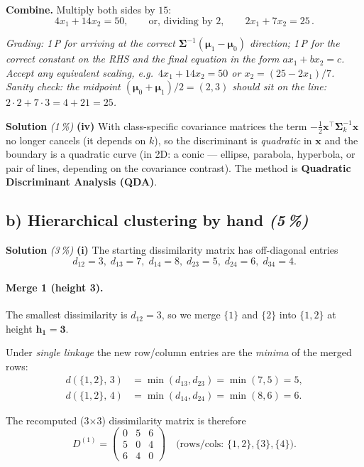 \documentclass[11pt,a4paper]{article}
\newcommand{\subpoints}[1]{\textit{(#1\,\%)}}
\newcommand{\sol}{\noindent\textbf{Solution}}
\begin{document}
\textbf{Combine.} Multiply both sides by $15$:
$$4 x_1 + 14 x_2 = 50, \qquad\text{or, dividing by 2,}\qquad
   \boxed{\,2 x_1 + 7 x_2 = 25\,}.$$

\noindent\emph{Grading: 1\,P for arriving at the correct $\boldsymbol\Sigma^{-1}(\boldsymbol\mu_1-\boldsymbol\mu_0)$
direction; 1\,P for the correct constant on the RHS and the final equation in the form
$ax_1+bx_2=c$. Accept any equivalent scaling, e.g.\ $4x_1+14x_2=50$ or $x_2 = (25-2x_1)/7$.
Sanity check: the midpoint $(\boldsymbol\mu_0+\boldsymbol\mu_1)/2 = (2,3)$ should sit on the line:
$2\cdot 2 + 7\cdot 3 = 4+21 = 25$. \checkmark}

\medskip
\sol{} \subpoints{1} \textbf{(iv)} With class-specific covariance matrices the term
$-\tfrac{1}{2}\mathbf{x}^\top\boldsymbol\Sigma_k^{-1}\mathbf{x}$ no longer cancels (it depends on
$k$), so the discriminant is \emph{quadratic} in $\mathbf{x}$ and the boundary is a quadratic
curve (in 2D: a conic --- ellipse, parabola, hyperbola, or pair of lines, depending on the
covariance contrast). The method is \textbf{Quadratic Discriminant Analysis (QDA)}.

\subsection*{b) Hierarchical clustering by hand \subpoints{5}}

\sol{} \subpoints{3} \textbf{(i)} The starting dissimilarity matrix has off-diagonal entries
$$d_{12}=3,\;d_{13}=7,\;d_{14}=8,\;d_{23}=5,\;d_{24}=6,\;d_{34}=4.$$

\paragraph{Merge 1 (height 3).} The smallest dissimilarity is $d_{12}=3$, so we merge
$\{1\}$ and $\{2\}$ into $\{1,2\}$ at height $\mathbf{h_1=3}$.

Under \emph{single linkage} the new row/column entries are the \emph{minima} of the merged rows:
\begin{align*}
d(\{1,2\},\,3) &= \min(d_{13},d_{23}) = \min(7,5) = 5, \\
d(\{1,2\},\,4) &= \min(d_{14},d_{24}) = \min(8,6) = 6.
\end{align*}

The recomputed (3$\times$3) dissimilarity matrix is therefore
$$D^{(1)} = \begin{pmatrix}
0 & 5 & 6 \\
5 & 0 & 4 \\
6 & 4 & 0
\end{pmatrix}
\quad\text{(rows/cols: $\{1,2\},\{3\},\{4\}$).}$$
\end{document}
